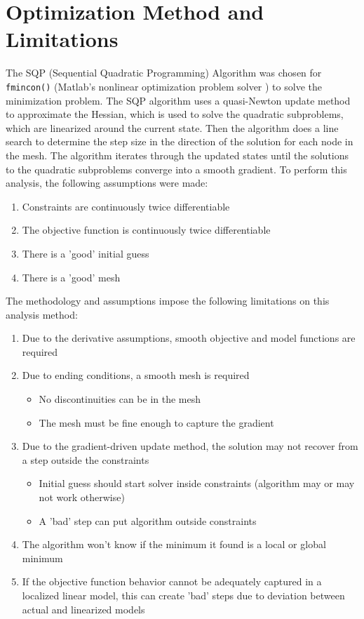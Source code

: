 \documentclass[11pt]{article}%
\begin{document}
\section{Optimization Method and Limitations}
\label{sec:optimizationmethod}
The SQP (Sequential Quadratic Programming) Algorithm was chosen for \lstinline{fmincon()} (Matlab's nonlinear optimization problem solver \cite{matlab}) to solve the minimization problem. The SQP algorithm uses a quasi-Newton update method to approximate the Hessian, which is used to solve the quadratic subproblems, which are linearized around the current state. Then the algorithm does a line search to determine the step size in the direction of the solution for each node in the mesh. The algorithm iterates through the updated states until the solutions to the quadratic subproblems converge into a smooth gradient. To perform this analysis, the following assumptions were made:
\begin{enumerate}
	\item Constraints are continuously twice differentiable
	\item The objective function is continuously twice differentiable
	\item There is a 'good' initial guess
	\item There is a 'good' mesh
\end{enumerate}
The methodology and assumptions impose the following limitations on this analysis method:
\begin{enumerate}
	\item Due to the derivative assumptions, smooth objective  and model functions are required
	\item Due to ending conditions, a smooth mesh is required
	\begin{itemize}
		\item No discontinuities can be in the mesh
		\item The mesh must be fine enough to capture the gradient 
	\end{itemize}
	\item Due to the gradient-driven update method, the solution may not recover from a step outside the constraints
	\begin{itemize}
		\item Initial guess should start solver inside constraints (algorithm may or may not work otherwise)
		\item A 'bad' step can put algorithm outside constraints
	\end{itemize}
	\item The algorithm won't know if the minimum it found is a local or global minimum 
	\item If the objective function behavior cannot be adequately captured in a localized linear model, this can create ’bad’ steps due to deviation between actual and linearized models
\end{enumerate}
\end{document}
